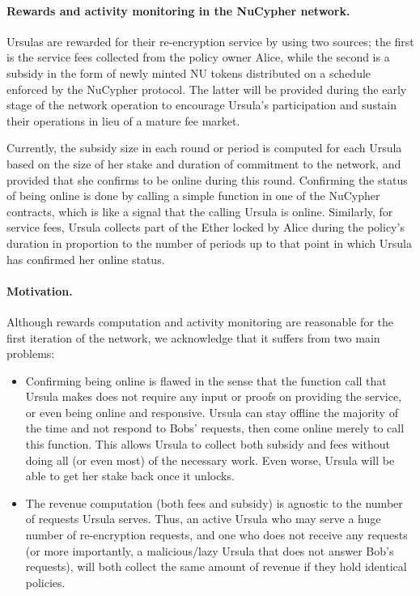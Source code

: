 \paragraph{\bf Rewards and activity monitoring in the NuCypher network.}
Ursulas are rewarded for their re-encryption service by using two sources; the first is the service fees collected from the policy owner Alice, while the second is a subsidy in the form of newly minted NU tokens distributed on a schedule enforced by the NuCypher protocol. The latter will be provided during the early stage of the network operation to encourage Ursula's participation and sustain their operations in lieu of a mature fee market.


Currently, the subsidy size in each round or period is computed for each Ursula based on the size of her stake and duration of commitment to the network, and provided that she confirms to be online during this round. Confirming the status of being online is done by calling a simple function in one of the NuCypher contracts, which is like a signal that the calling Ursula is online. Similarly, for service fees, Ursula collects part of the Ether locked by Alice during the policy's duration in proportion to the number of periods up to that point in which Ursula has confirmed her online status.


\paragraph{\bf Motivation.} Although rewards computation and activity monitoring are reasonable for the first iteration of the network, we acknowledge that it suffers from two main problems:
\begin{itemize}
\setlength{\itemsep}{0pt}
\item Confirming being online is flawed in the sense that the function call that Ursula makes does not require any input or proofs on providing the service, or even being online and responsive. Ursula can stay offline the majority of the time and not respond to Bobs' requests, then come online merely to call this function. This allows Ursula to collect both subsidy and fees without doing all (or even most) of the necessary work. Even worse, Ursula will be able to get her stake back once it unlocks.

\item The revenue computation (both fees and subsidy) is agnostic to the number of requests Ursula serves. Thus, an active Ursula who may serve a huge number of re-encryption requests, and one who does not receive any requests (or more importantly, a malicious/lazy Ursula that does not answer Bob's requests), will both collect the same amount of revenue if they hold identical policies.
\end{itemize}

